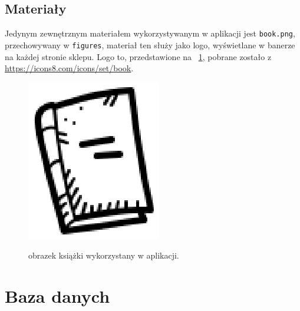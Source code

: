 
\subsection{Materiały}

Jedynym zewnętrznym materiałem wykorzystywanym w aplikacji jest \texttt{book.png}, przechowywany w \texttt{figures}, materiał ten służy jako logo, wyświetlane w banerze na każdej stronie sklepu.
Logo to, przedstawione na  \figurename~\ref{fig3}, pobrane zostało z \url{https://icons8.com/icons/set/book}.
\begin{figure}[H]
    \centering
    \includegraphics[width=\linewidth]{figures/fig_0003.eps}\\
    \caption{obrazek książki wykorzystany w aplikacji.\label{fig3}}
\end{figure}


\section{Baza danych}

